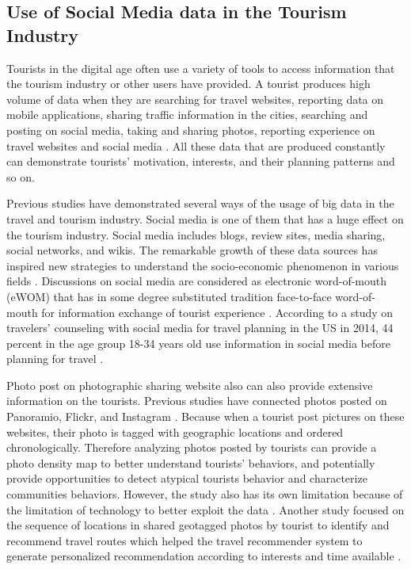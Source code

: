\documentclass[sigconf]{acmart}
\begin{document}
\subsection{Use of Social Media data in the Tourism Industry}
Tourists in the digital age often use a variety of tools to access information that the tourism industry or other users have provided. A tourist produces high volume of data when they are searching for travel websites, reporting data on mobile applications, sharing traffic information in the cities, searching and posting on social media, taking and sharing photos, reporting experience on travel websites and social media \cite{akerkar2012, Shafiee16}. All these data that are produced constantly can demonstrate tourists’ motivation, interests, and their planning patterns and so on.

Previous studies have demonstrated several ways of the usage of big data in the travel and tourism industry. Social media is one of them that has a huge effect on the tourism industry. Social media includes blogs, review sites, media sharing, social networks, and wikis. The remarkable growth of these data sources has inspired new strategies to understand the socio-economic phenomenon in various fields \cite{Shafiee16}. Discussions on social media are considered as electronic word-of-mouth (eWOM) that has in some degree substituted tradition face-to-face word-of-mouth for information exchange of tourist experience \cite{chung2009}. According to a study on travelers' counseling with social media for travel planning in the US in 2014, 44 percent in the age group 18-34 years old use information in social media before planning for travel \cite{statistics14}.


Photo post on photographic sharing website also can also provide extensive information on the tourists. Previous studies have connected photos posted on Panoramio, Flickr, and Instagram \cite{GJT14, MIAH2017}. Because when a tourist post pictures on these websites, their photo is tagged with geographic locations and ordered chronologically. Therefore analyzing photos posted by tourists can provide a photo density map to better understand tourists' behaviors, and potentially provide opportunities to detect atypical tourists behavior and characterize communities behaviors. However, the study also has its own limitation because of the limitation of technology to better exploit the data \cite{GJT14}. Another study focused on the sequence of locations in shared geotagged photos by tourist to identify and recommend travel routes which helped the travel recommender system to generate personalized recommendation according to interests and time available \cite{kurashima2013travel}. 
\end{document}
